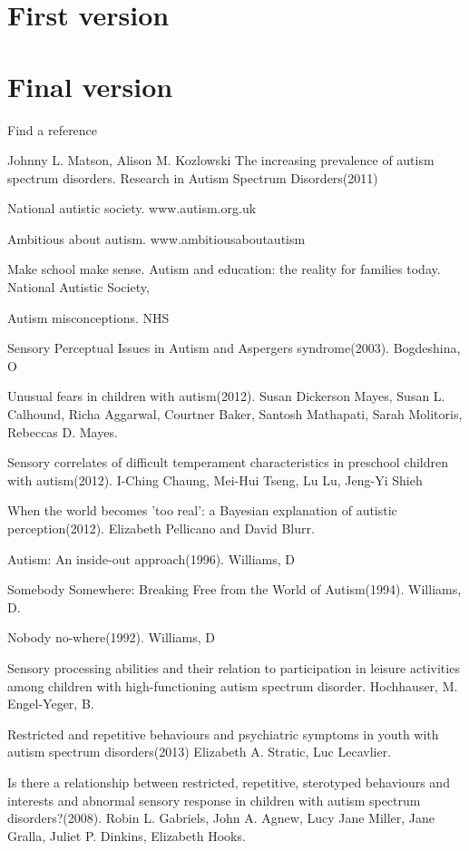 \documentclass[11pt]{report}
\begin{document}
\chapter{First version}

\chapter{Final version}

\begin{thebibliography}{9}

Find a reference

Johnny L. Matson, Alison M. Kozlowski
The increasing prevalence of autism spectrum disorders. Research in Autism Spectrum Disorders(2011)

National autistic society. www.autism.org.uk

Ambitious about autism. www.ambitiousaboutautism

Make school make sense. Autism and education: the reality for families today. National Autistic Society, 

Autism misconceptions. NHS

Sensory Perceptual Issues in Autism and Aspergers syndrome(2003). Bogdeshina, O

Unusual fears in children with autism(2012). Susan Dickerson Mayes, Susan L. Calhound, Richa Aggarwal, Courtner Baker, Santosh Mathapati, Sarah Molitoris, Rebeccas D. Mayes.

Sensory correlates of difficult temperament characteristics in preschool children with autism(2012). I-Ching Chaung, Mei-Hui Tseng, Lu Lu, Jeng-Yi Shieh

When the world becomes 'too real': a Bayesian explanation of autistic perception(2012). Elizabeth Pellicano and David Blurr.

Autism: An inside-out approach(1996). Williams, D

Somebody Somewhere: Breaking Free from the World of Autism(1994). Williams, D.

Nobody no-where(1992). Williams, D

Sensory processing abilities and their relation to participation in leisure activities among children with high-functioning autism spectrum disorder. Hochhauser, M. Engel-Yeger, B.

Restricted and repetitive behaviours and psychiatric symptoms in youth with autism spectrum disorders(2013) Elizabeth A. Stratic, Luc Lecavlier.

Is there a relationship between restricted, repetitive, sterotyped behaviours and interests and abnormal sensory response in children with autism spectrum disorders?(2008). Robin L. Gabriels, John A. Agnew, Lucy Jane Miller, Jane Gralla, Juliet P. Dinkins, Elizabeth Hooks.


\end{thebibliography}
\end{document}
